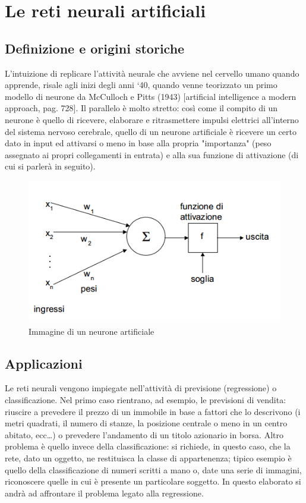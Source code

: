\documentclass[12pt]{report}
\begin{document}
\tableofcontents

\chapter{Le reti neurali artificiali}

\linespread{1.4}\selectfont
\section{Definizione e origini storiche}
L’intuizione di replicare l’attività neurale che avviene nel cervello umano quando apprende, risale agli inizi degli anni ‘40, quando venne teorizzato un primo modello di neurone da McCulloch e Pitts (1943) [artificial intelligence a modern approach, pag. 728]. Il parallelo è molto stretto: così come il compito di un neurone è quello di ricevere, elaborare e ritrasmettere impulsi elettrici all’interno del sistema nervoso cerebrale, quello di un neurone artificiale è ricevere un certo dato in input ed attivarsi o meno in base alla propria "importanza" (peso assegnato ai propri collegamenti in entrata) e alla sua funzione di attivazione (di cui si parlerà in seguito).

\begin{figure}
\begin{center}
\includegraphics[scale=0.75]{neurone_artificiale.png}
\caption{Immagine di un neurone artificiale}
\end{center}
\end{figure}

\section{Applicazioni}
Le reti neurali vengono impiegate nell’attività di previsione (regressione) o classificazione.
Nel primo caso rientrano, ad esempio, le previsioni di vendita: riuscire a prevedere il prezzo di un immobile in base a fattori che lo descrivono (i metri quadrati, il numero di stanze, la posizione centrale o meno in un centro abitato, ecc…) o prevedere l’andamento di un titolo azionario in borsa.
Altro problema è quello invece della classificazione: si richiede, in questo caso, che la rete, dato un oggetto, ne restituisca la classe di appartenenza; tipico esempio è quello della classificazione di numeri scritti a mano o, date una serie di immagini, riconoscere quelle in cui è presente un particolare soggetto.
In questo elaborato si andrà ad affrontare il problema legato alla regressione.
\end{document}
